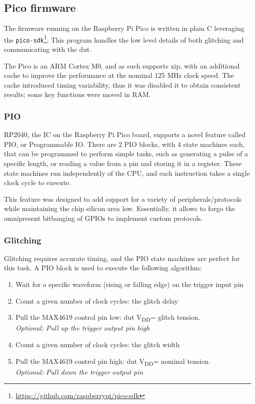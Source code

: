 \documentclass[a4paper,english,twoside,10pt]{article}
\newcommand{\vdd}{V\textsubscript{DD}}
\begin{document}
\subsection{Pico firmware}
The firmware running on the Raspberry Pi Pico is written in plain C leveraging the \texttt{pico-sdk}\footnote{\url{https://github.com/raspberrypi/pico-sdk}}. This program handles the low level details of both glitching and communicating with the \gls{dut}.

The Pico is an ARM Cortex M0, and as such supports \gls{xip}, with an additional cache to improve the performance at the nominal 125 MHz clock speed. The cache introduced timing variability, thus it was disabled it to obtain consistent results; some key functions were moved in RAM.

\subsubsection{PIO}
RP2040, the IC on the Raspberry Pi Pico board, supports a novel feature called PIO, or Programmable IO. There are 2 PIO blocks, with 4 state machines each, that can be programmed to perform simple tasks, such as generating a pulse of a specific length, or reading a value from a pin and storing it in a register. These state machines run independently of the CPU, and each instruction takes a single clock cycle to execute.

This feature was designed to add support for a variety of peripherals/protocols while maintaining the chip silicon area low. Essentially, it allows to forgo the omnipresent bitbanging of GPIOs to implement custom protocols.

\subsubsection{Glitching}
Glitching requires accurate timing, and the PIO state machines are perfect for this task. A PIO block is used to execute the following algorithm:
\begin{enumerate}
	\item Wait for a specific waveform (rising or falling edge) on the trigger input pin
	\item Count a given number of clock cycles: the glitch delay
	\item Pull the MAX4619 control pin low: \gls{dut} \vdd = glitch tension.\\
		  \textit{Optional: Pull up the trigger output pin high}
	\item Count a given number of clock cycles: the glitch width
	\item Pull the MAX4619 control pin high: \gls{dut} \vdd = nominal tension.\\
		  \textit{Optional: Pull down the trigger output pin}
\end{enumerate}
\end{document}
